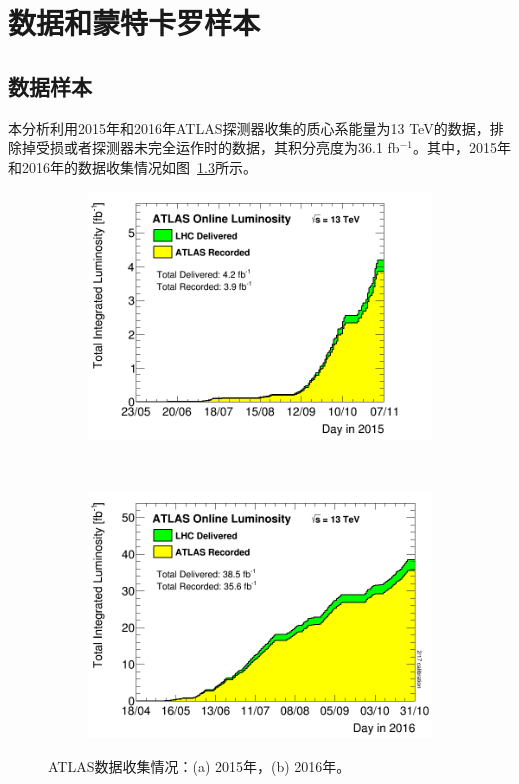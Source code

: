 \chapter{数据和蒙特卡罗样本}\label{chap:dataMC}

\section{数据样本}
本分析利用2015年和2016年ATLAS探测器收集的质心系能量为13 TeV的数据，排除掉受损或者探测器未完全运作时的数据，其积分亮度为36.1 fb$^{-1}$。其中，2015年和2016年的数据收集情况如图~\ref{fig:data_taking}所示。
\begin{figure}[!htbp]
    \centering
    \begin{subfigure}[b]{0.45\textwidth}
      \includegraphics[width=\textwidth]{fig/sumLumiByDay.png}
      \caption{}
      \label{fig:data_taking_2015}
    \end{subfigure}%
    ~%
    \begin{subfigure}[b]{0.45\textwidth}
      \includegraphics[width=\textwidth]{fig/sumLumiByDay_2016.png}
      \caption{}
      \label{fig:data_taking_2016}
    \end{subfigure}
    \caption{ATLAS数据收集情况：(a) 2015年，(b) 2016年。}
    \label{fig:data_taking}
\end{figure}

